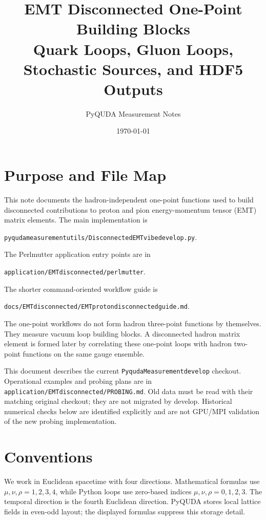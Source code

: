 \documentclass[11pt,a4paper]{article}
\title{\textbf{EMT Disconnected One-Point Building Blocks}\\[4pt]
       \large Quark Loops, Gluon Loops, Stochastic Sources, and HDF5 Outputs}
\author{PyQUDA Measurement Notes}
\date{\today}
\newcommand{\code}[1]{\texttt{\begingroup\def\_{\textunderscore\allowbreak}#1\endgroup}}
\begin{document}
\maketitle
\tableofcontents

\section{Purpose and File Map}

This note documents the hadron-independent one-point functions used to build
disconnected contributions to proton and pion energy-momentum tensor (EMT)
matrix elements.  The main implementation is
\begin{center}
  \code{pyquda\_measurement\_utils/Disconnected\_1pt\_EMT\_vibe\_develop.py}.
\end{center}
The Perlmutter application entry points are in
\begin{center}
  \code{application/EMT\_disconnected\_1pt/perlmutter}.
\end{center}
The shorter command-oriented workflow guide is
\begin{center}
  \code{docs/EMT\_disconnected\_1pt/EMT\_proton\_disconnected\_guide.md}.
\end{center}

The one-point workflows do not form hadron three-point functions by themselves.
They measure vacuum loop building blocks.  A disconnected hadron matrix element
is formed later by correlating these one-point loops with hadron two-point
functions on the same gauge ensemble.

This document describes the current \code{Pyquda\_Measurement\_develop}
checkout. Operational examples and probing plans are in
\code{application/EMT\_disconnected\_1pt/PROBING.md}. Old data must be read
with their matching original checkout; they are not migrated by develop.
Historical numerical checks below are identified explicitly and are not GPU/MPI
validation of the new probing implementation.

\section{Conventions}

We work in Euclidean spacetime with four directions.  Mathematical formulas use
\(\mu,\nu,\rho = 1,2,3,4\), while Python loops use zero-based indices
\(\mu,\nu,\rho = 0,1,2,3\).  The temporal direction is the fourth Euclidean
direction.  PyQUDA stores local lattice fields in even-odd layout; the displayed
formulas suppress this storage detail.
\end{document}
